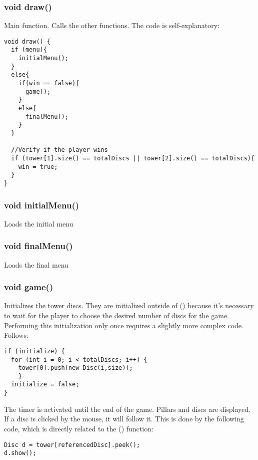 \documentclass[
	12pt,				%
	oneside,			%
	a4paper,			%
	english,			%
	brazil,				%
	]{abntex2}
\begin{document}
{\subsubsection{void draw()}
Main function. Calls the other functions. The code is self-explanatory:

\begin{itshape}
\begin{verbatim}
void draw() {
  if (menu){
    initialMenu(); 
  }
  else{
    if(win == false){  
      game();
    }
    else{
      finalMenu();
    }
  }

  //Verify if the player wins
  if (tower[1].size() == totalDiscs || tower[2].size() == totalDiscs){
    win = true;  
  }
}

\end{verbatim}
\end{itshape}
\subsubsection{void initialMenu()}
Loads the initial menu
\subsubsection{void finalMenu()}
Loads the final menu
\subsubsection{void game()}
Initializes the tower discs. They are initialized outside of \setup() because it's necessary to wait for the player to choose the desired number of discs for the game. Performing this initialization only once requires a slightly more complex code. Follows:

\begin{itshape}
\begin{verbatim}
if (initialize) {
  for (int i = 0; i < totalDiscs; i++) {
    tower[0].push(new Disc(i,size));
    }
  initialize = false;
}
\end{verbatim}
\end{itshape}

The timer is activated until the end of the game. Pillars and discs are displayed. If a disc is clicked by the mouse, it will follow it. This is done by the following code, which is directly related to the \moveDisc() function:

\begin{itshape}
\begin{verbatim}
Disc d = tower[referencedDisc].peek();
d.show();
      

\end{verbatim}
\end{itshape}}
\end{document}
